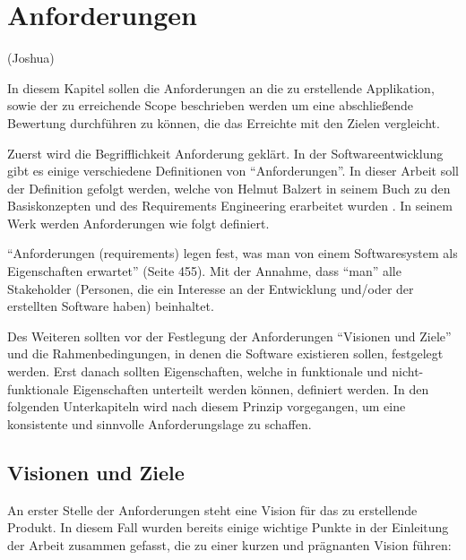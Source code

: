 \chapter{Anforderungen}\label{sec:anforderungen}

(Joshua)

In diesem Kapitel sollen die Anforderungen an die zu erstellende Applikation, sowie der zu erreichende Scope beschrieben werden um eine abschließende Bewertung durchführen zu können, die das Erreichte mit den Zielen vergleicht.

\vspace{0.25cm}

Zuerst wird die Begrifflichkeit Anforderung geklärt. In der Softwareentwicklung gibt es einige verschiedene Definitionen von \enquote{Anforderungen}. In dieser Arbeit soll der Definition gefolgt werden, welche von Helmut Balzert in seinem Buch zu den Basiskonzepten und des Requirements Engineering erarbeitet wurden \cite{Balzert.2009}. In seinem Werk werden Anforderungen wie folgt definiert.

\begin{defStrich}[Anforderungen]
	\enquote{Anforderungen (requirements) legen fest, was man von einem
		Softwaresystem als Eigenschaften erwartet}\cite{Balzert.2009} (Seite 455). Mit der Annahme, dass \enquote{man} alle Stakeholder (Personen, die ein Interesse an der Entwicklung und/oder der erstellten Software haben) beinhaltet. \cite{Balzert.2009}
\end{defStrich} 

Des Weiteren sollten vor der Festlegung der Anforderungen \enquote{Visionen und Ziele} und die Rahmenbedingungen, in denen die Software existieren sollen, festgelegt werden. Erst danach sollten Eigenschaften, welche in funktionale und nicht-funktionale Eigenschaften unterteilt werden können, definiert werden. In den folgenden Unterkapiteln wird nach diesem Prinzip vorgegangen, um eine konsistente und sinnvolle Anforderungslage zu schaffen.

\section{Visionen und Ziele}
An erster Stelle der Anforderungen steht eine Vision für das zu erstellende Produkt. In diesem Fall wurden bereits einige wichtige Punkte in der Einleitung der Arbeit zusammen gefasst, die zu einer kurzen und prägnanten Vision führen:

\vspace{0.25cm}

